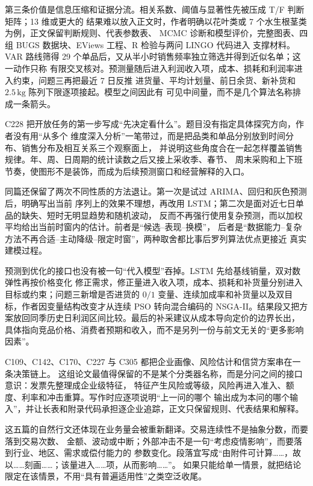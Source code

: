 第三条价值是信息压缩和证据分流。相关系数、阈值与显著性先被压成 T/F 判断矩阵；13 维或更大的
结果难以放入正文时，作者明确以花叶类或 7 个水生根茎类为例，正文保留判断规则、代表参数表、
MCMC 诊断和模型评价，完整图表、四组 BUGS 数据块、EViews 工程、R 检验与两问 LINGO 代码进入
支撑材料。VAR 路线筛得 29 个单品后，又从半小时销售频率独立筛选并得到近似名单；这一动作只称
有限交叉核对。预测量随后进入利润收入项，成本、损耗和利润率进入约束，问题三再把最近 7 日反推
进货量、平均计划量、前日余货、新补货和 $2.5\,\mathrm{kg}$ 陈列下限逐项接起。模型之间因此有
可见中间量，而不是几个算法名称排成一条箭头。

C228 把开放任务的第一步写成“先决定看什么”。题目没有指定具体探究方向，作者没有用“从多个
维度深入分析”一笔带过，而是把品类和单品分别放到时间分布、销售分布及相互关系三个观察面上，
并说明这些角度合在一起怎样覆盖销售规律。年、周、日周期的统计读数之后又接上采收季、春节、
周末采购和上下班节奏，使图形不是装饰，而成为后续预测窗口和经营解释的入口。

同篇还保留了两次不同性质的方法退让。第一次是试过 ARIMA、回归和灰色预测后，明确写出当前
序列上的效果不理想，再改用 LSTM；第二次是面对近七日单品的缺失、短时无明显趋势和随机波动，
反而不再强行使用复杂预测，而以加权平均给出当前时窗内的估计。前者是“候选--表现--换模”，
后者是“数据能力--复杂方法不再合适--主动降级--限定时窗”，两种取舍都比事后罗列算法优点更接近
真实建模过程。

预测到优化的接口也没有被一句“代入模型”吞掉。LSTM 先给基线销量，双对数弹性再按价格变化
修正需求，修正量进入收入项，成本、损耗和补货量分别进入目标或约束；问题三新增是否进货的
$0/1$ 变量、连续加成率和补货量以及双目标，作者因变量结构改变才从连续 PSO 转向混合编码的
NSGA-II。结果段又把方案放回同季历史日利润区间比较。最后的补采建议从成本导向定价的边界长出，
具体指向竞品价格、消费者预期和收入，而不是另列一份与前文无关的“更多影响因素”。

C109、C142、C170、C227 与 C305 都把企业画像、风险估计和信贷方案串在一条决策链上。
这组论文最值得保留的不是某个分类器名称，而是分问之间的接口意识：发票先整理成企业级特征，
特征产生风险或等级，风险再进入准入、额度、利率和冲击重算。写作时应逐项说明“上一问的哪个
输出成为本问的哪个输入”，并让长表和附录代码承担逐企业追踪，正文只保留规则、代表结果和解释。

这五篇的自然行文还体现在业务量会被重新翻译。交易连续性不是抽象分数，而要落到交易次数、
金额、波动或中断；外部冲击不是一句“考虑疫情影响”，而要落到行业、地区、需求或偿付能力的
参数变化。段落宜写成“由附件可计算……，故以……刻画……；该量进入……项，从而影响……”。
如果只能给单一情景，就把结论限定在该情景，不用“具有普遍适用性”之类空泛收尾。

